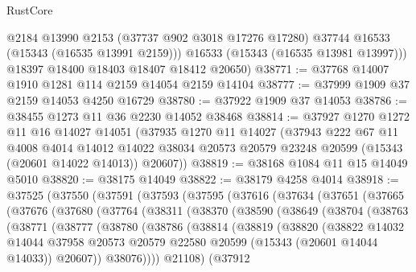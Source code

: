 \begin{lexlean}{RustCore}
\begin{coremodule}
          @2184
          @13990
          @2153
          (@37737 @902 @3018 @17276 @17280)
          @37744
          @16533
          (@15343 (@16535 @13991 @2159)))
        @16533
        (@15343 (@16535 @13981 @13997)))
      @18397
      @18400
      @18403
      @18407
      @18412
      @20650)
@38771 := @37768 @14007 @1910 @1281 @114 @2159 @14054 @2159 @14104
@38777 := @37999 @1909 @37 @2159 @14053 @4250 @16729
@38780 := @37922 @1909 @37 @14053
@38786 := @38455 @1273 @11 @36 @2230 @14052 @38468
@38814 := @37927
    @1270
    @1272
    @11
    @16
    @14027
    @14051
    (@37935
      @1270
      @11
      @14027
      (@37943
        @222
        @67
        @11
        @4008
        @4014
        @14012
        @14022
        @38034
        @20573
        @20579
        @23248
        @20599
        (@15343 (@20601 @14022 @14013))
        @20607))
@38819 := @38168 @1084 @11 @15 @14049 @5010
@38820 := @38175 @14049
@38822 := @38179 @4258 @4014
@38918 := @37525
    (@37550
      (@37591
        (@37593
          (@37595
            (@37616
              (@37634
                (@37651
                  (@37665
                    (@37676
                      (@37680
                        (@37764
                          (@38311
                            (@38370
                              (@38590
                                (@38649
                                  (@38704
                                    (@38763
                                      (@38771
                                        (@38777
                                          (@38780
                                            (@38786
                                              (@38814
                                                (@38819
                                                  (@38820
                                                    (@38822
                                                      @14032
                                                      @14044
                                                      @37958
                                                      @20573
                                                      @20579
                                                      @22580
                                                      @20599
                                                      (@15343 (@20601 @14044 @14033))
                                                      @20607))
                                                  @38076))))
                                          @21108)
                                        (@37912

\end{coremodule}
\end{lexlean}
